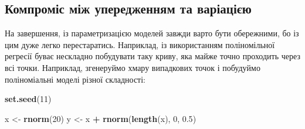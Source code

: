 \documentclass[
  11pt,
]{book}
\newenvironment{Shaded}{\begin{snugshade}}{\end{snugshade}}
\newcommand{\DecValTok}[1]{\textcolor[rgb]{0.00,0.00,0.81}{#1}}
\newcommand{\FloatTok}[1]{\textcolor[rgb]{0.00,0.00,0.81}{#1}}
\newcommand{\FunctionTok}[1]{\textcolor[rgb]{0.13,0.29,0.53}{\textbf{#1}}}
\newcommand{\NormalTok}[1]{#1}
\newcommand{\OtherTok}[1]{\textcolor[rgb]{0.56,0.35,0.01}{#1}}
\newcommand{\SpecialCharTok}[1]{\textcolor[rgb]{0.81,0.36,0.00}{\textbf{#1}}}
\begin{document}
\subsection{Компроміс між упередженням та варіацією}\label{bias-variance}

На завершення, із параметризацією моделей завжди варто бути обережними, бо із цим дуже легко перестаратись. Наприклад, із використанням поліномільної регресії буває нескладно побудувати таку криву, яка майже точно проходить через всі точки. Наприклад, згенеруймо хмару випадкових точок і побудуймо поліноміальні моделі різної складності:

\begin{Shaded}
\begin{Highlighting}[]
\FunctionTok{set.seed}\NormalTok{(}\DecValTok{11}\NormalTok{)}

\NormalTok{x }\OtherTok{\textless{}{-}} \FunctionTok{rnorm}\NormalTok{(}\DecValTok{20}\NormalTok{)}
\NormalTok{y }\OtherTok{\textless{}{-}}\NormalTok{ x }\SpecialCharTok{+} \FunctionTok{rnorm}\NormalTok{(}\FunctionTok{length}\NormalTok{(x), }\DecValTok{0}\NormalTok{, }\FloatTok{0.5}\NormalTok{)}


\end{Highlighting}
\end{Shaded}
\end{document}
